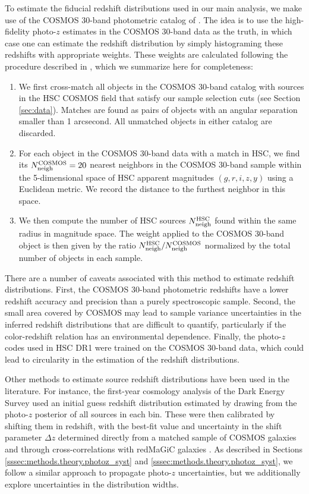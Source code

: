 \documentclass[a4paper,11pt]{article}
\begin{document}
    To estimate the fiducial redshift distributions used in our main analysis, we make use of the COSMOS 30-band photometric catalog of \cite{2016ApJS..224...24L}. The idea is to use the high-fidelity photo-$z$ estimates in the COSMOS 30-band data as the truth, in which case one can estimate the redshift distribution by simply histograming these redshifts with appropriate weights. These weights are calculated following the procedure described in \cite{2017MNRAS.465.1454H,2019PASJ...71...43H}, which we summarize here for completeness:
    \begin{enumerate}
      \item We first cross-match all objects in the COSMOS 30-band catalog with sources in the HSC COSMOS field that satisfy our sample selection cuts (see Section \ref{sec:data}). Matches are found as pairs of objects with an angular separation smaller than 1 arcsecond. All unmatched objects in either catalog are discarded.
      \item For each object in the COSMOS 30-band data with a match in HSC, we find its $N_{\rm neigh}^{\rm COSMOS}=20$ nearest neighbors in the COSMOS 30-band sample within the 5-dimensional space of HSC apparent magnitudes $(g,r,i,z,y)$ using a Euclidean metric. We record the distance to the furthest neighbor in this space.
      \item We then compute the number of HSC sources $N_{\rm neigh}^{\rm HSC}$ found within the same radius in magnitude space. The weight applied to the COSMOS 30-band object is then given by the ratio $N^{\rm HSC}_{\rm neigh}/N^{\rm COSMOS}_{\rm neigh}$ normalized by the total number of objects in each sample.
    \end{enumerate}
    There are a number of caveats associated with this method to estimate redshift distributions. First, the COSMOS 30-band photometric redshifts have a lower redshift accuracy and precision than a purely spectroscopic sample. Second, the small area covered by COSMOS may lead to sample variance uncertainties in the inferred redshift distributions that are difficult to quantify, particularly if the color-redshift relation has an environmental dependence. Finally, the photo-$z$ codes used in HSC DR1 were trained on the COSMOS 30-band data, which could lead to circularity in the estimation of the redshift distributions.
    
    Other methods to estimate source redshift distributions have been used in the literature. For instance, the first-year cosmology analysis of the Dark Energy Survey \citep{1708.01530,2018MNRAS.478..592H} used an initial guess redshift distribution estimated by drawing from the photo-$z$ posterior of all sources in each bin. These were then calibrated by shifting them in redshift, with the best-fit value and uncertainty in the shift parameter $\Delta z$ determined directly from a matched sample of COSMOS galaxies \citep{2018MNRAS.478..592H} and through cross-correlations with redMaGiC galaxies \citep{2018MNRAS.481.2427C}. As described in Sections \ref{sssec:methods.theory.photoz_syst} and \ref{sssec:methods.theory.photoz_syst}, we follow a similar approach to propagate photo-$z$ uncertainties, but we additionally explore uncertainties in the distribution widths.
\end{document}
